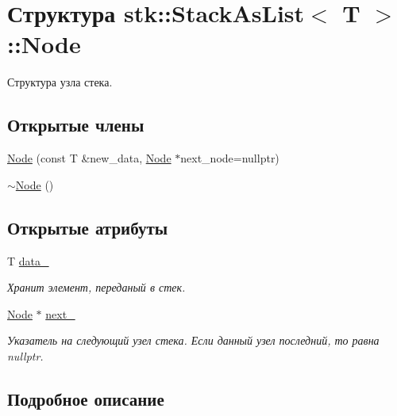 \hypertarget{structstk_1_1_stack_as_list_1_1_node}{}\section{Структура stk\+:\+:Stack\+As\+List$<$ T $>$\+:\+:Node}
\label{structstk_1_1_stack_as_list_1_1_node}


Структура узла стека.  


\subsection*{Открытые члены}
\begin{DoxyCompactItemize}
\item 
\hyperlink{structstk_1_1_stack_as_list_1_1_node_ad61cfb928b1f9a6c8d8a3d77982826c8}{Node} (const T \&new\+\_\+data, \hyperlink{structstk_1_1_stack_as_list_1_1_node}{Node} $\ast$next\+\_\+node=nullptr)
\item 
\hyperlink{structstk_1_1_stack_as_list_1_1_node_a34fa2b48f60262c41d17caabba4dccf5}{$\sim$\+Node} ()
\end{DoxyCompactItemize}
\subsection*{Открытые атрибуты}
\begin{DoxyCompactItemize}
\item 
T \hyperlink{structstk_1_1_stack_as_list_1_1_node_a7a634b5814175d7bcdee465da07ca3d4}{data\+\_\+}
\begin{DoxyCompactList}\small\item\em Хранит элемент, переданый в стек. \end{DoxyCompactList}\item 
\hyperlink{structstk_1_1_stack_as_list_1_1_node}{Node} $\ast$ \hyperlink{structstk_1_1_stack_as_list_1_1_node_a45d62691349a0aac6d0c03cd2f1c35f5}{next\+\_\+}
\begin{DoxyCompactList}\small\item\em Указатель на следующий узел стека. Если данный узел последний, то равна nullptr. \end{DoxyCompactList}\end{DoxyCompactItemize}


\subsection{Подробное описание}
